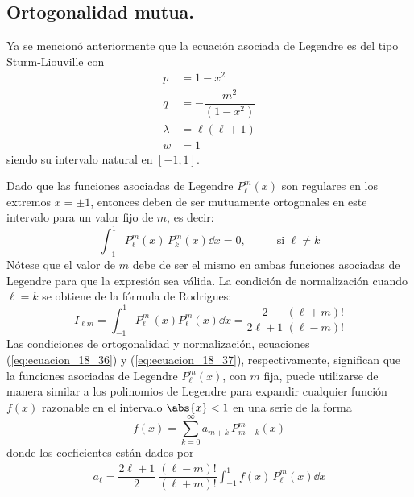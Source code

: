 \subsection*{Ortogonalidad mutua.}
Ya se mencionó anteriormente que la ecuación asociada de Legendre es del tipo Sturm-Liouville con
\begin{align*}
p &= 1 - x^{2} \\
q &= - \dfrac{m^{2}}{(1 - x^{2})} \\
\lambda &= \ell (\ell + 1) \\
w &= 1
\end{align*}
siendo su intervalo natural en $[-1,1]$.
\par
Dado que las funciones asociadas de Legendre $P_{\ell}^{m} (x)$ son regulares en los extremos $x = \pm 1$, entonces deben de ser mutuamente ortogonales en este intervalo para un valor fijo de $m$, es decir:
\begin{equation}
\int_{-1}^{1} P_{\ell}^{m} (x) \, P_{k}^{m} (x) \dd{x}  = 0, \hspace{1cm} \text{ si } \ell \neq	 k
\label{eq:ecuacion_18_36}
\end{equation}
Nótese que el valor de $m$ debe de ser el mismo en ambas funciones asociadas de Legendre para que la expresión sea válida. La condición de normalización cuando $\ell = k$ se obtiene de la fórmula de Rodrigues:
\begin{equation}
I_{\ell m} = \int_{-1}^{1} P_{\ell}^{m} \, (x) P_{\ell}^{m} (x) \dd{x} = \dfrac{2}{2 \ell + 1} \, \dfrac{(\ell +m)!}{(\ell - m)!}
\label{eq:ecuacion_18_37}
\end{equation}
Las condiciones de ortogonalidad y normalización, ecuaciones (\ref{eq:ecuacion_18_36}) y (\ref{eq:ecuacion_18_37}), respectivamente, significan que la funciones asociadas de Legendre $P_{\ell}^{m}(x)$, con $m$ fija, puede utilizarse de  manera similar a los polinomios de Legendre para expandir cualquier función $f(x)$ razonable en el intervalo $\abs{x} < 1$ en una serie de la forma
\begin{equation}
f(x) = \sum_{k=0}^{\infty} a_{m+k} \, P_{m+k}^{m} (x)
\label{eq:ecuacion_18_38}
\end{equation}
donde los coeficientes están dados por
\begin{align*}
a_{\ell} = \dfrac{2 \ell + 1}{2} \: \dfrac{(\ell - m)!}{(\ell + m)!} \int_{-1}^{1} f(x) \, P_{\ell}^{m} (x) \dd{x}
\end{align*}
